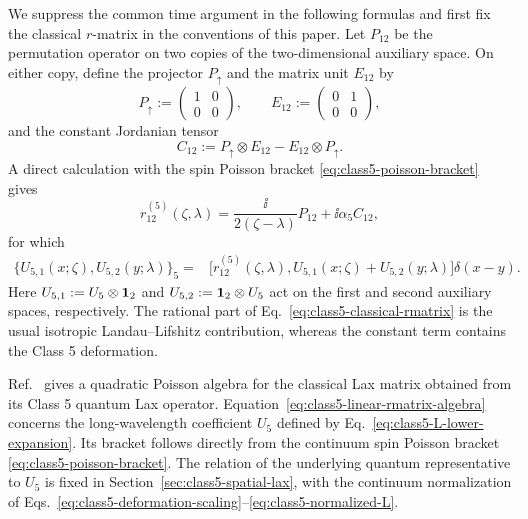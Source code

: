 We suppress the common time argument in the following formulas and first
fix the classical $r$-matrix in the conventions of this paper.  Let
$P_{12}$ be the permutation operator on two copies of the two-dimensional
auxiliary space.  On either copy, define the projector $P_{\uparrow}$ and
the matrix unit $E_{12}$ by
\begin{equation}
P_{\uparrow}:=
\begin{pmatrix}1&0\\0&0\end{pmatrix},
\qquad
E_{12}:=
\begin{pmatrix}0&1\\0&0\end{pmatrix},
\label{eq:class5-rmatrix-elementary-matrices}
\end{equation}
and the constant Jordanian tensor
\begin{equation}
C_{12}
:=
P_{\uparrow}\otimes E_{12}
-
E_{12}\otimes P_{\uparrow}.
\label{eq:class5-jordanian-tensor}
\end{equation}
A direct calculation with the spin Poisson bracket
\eqref{eq:class5-poisson-bracket} gives
\begin{equation}
r^{(5)}_{12}(\zeta,\lambda)
=
\frac{\ii}{2(\zeta-\lambda)}P_{12}
+\ii\alpha_5 C_{12},
\label{eq:class5-classical-rmatrix}
\end{equation}
for which
\begin{align}
\{U_{5,1}(x;\zeta),U_{5,2}(y;\lambda)\}_5
={}&
\bigl[
 r^{(5)}_{12}(\zeta,\lambda),
 U_{5,1}(x;\zeta)+U_{5,2}(y;\lambda)
\bigr]\delta(x-y).
\label{eq:class5-linear-rmatrix-algebra}
\end{align}
Here
$U_{5,1}:=U_5\otimes\mathbf{1}_2$ and
$U_{5,2}:=\mathbf{1}_2\otimes U_5$ act on the first and second auxiliary spaces,
respectively.  The rational part of
Eq.~\eqref{eq:class5-classical-rmatrix} is the usual isotropic
Landau--Lifshitz contribution, whereas the constant term contains the Class 5
deformation.

Ref.~\cite{deLeeuwFontanellaNietoGarcia2026} gives a quadratic Poisson
algebra for the classical Lax matrix obtained from its Class 5 quantum Lax
operator.  Equation~\eqref{eq:class5-linear-rmatrix-algebra} concerns the
long-wavelength coefficient $U_5$ defined by
Eq.~\eqref{eq:class5-L-lower-expansion}.  Its bracket follows directly from
the continuum spin Poisson bracket
\eqref{eq:class5-poisson-bracket}.  The relation of the underlying quantum
representative to $U_5$ is fixed in
Section~\ref{sec:class5-spatial-lax}, with the continuum normalization of
Eqs.~\eqref{eq:class5-deformation-scaling}--\eqref{eq:class5-normalized-L}.

